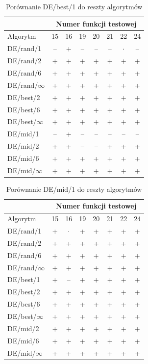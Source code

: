 \documentclass[a4paper,onecolumn,oneside,12pt,wide,floatssmall]{mwrep}
\theoremstyle{definition}
\theoremstyle{plain}%
\theoremstyle{remark}
\begin{document}
\begin{table}[H]
\centering
\begin{tabular}{ l | c | c | c | c | c | c | c }
		 & \multicolumn{7}{c}{Numer funkcji testowej}  \\  \hline
Algorytm         &15& 16& 19& 20& 21& 22& 24 \\ \hline
DE/rand/1	 & -- & + & -- & -- & -- & $\cdot$ & -- \\
DE/rand/2	 & + & + & + & + & + & + & + \\
DE/rand/6	 & + & + & + & + & + & + & + \\
DE/rand/$\infty$	 & + & + & + & + & + & + & + \\
DE/best/2	 & + & + & + & + & + & + & + \\
DE/best/6	 & + & + & + & + & + & + & + \\
DE/best/$\infty$	 & + & + & + & + & + & + & + \\
DE/mid/1	 & -- & + & -- & -- & -- & -- & -- \\
DE/mid/2	 & + & + & -- & -- & + & + & + \\
DE/mid/6	 & + & + & + & + & + & + & + \\
DE/mid/$\infty$	 & + & + & + & + & + & + & + \\

\end{tabular}
\caption{Porównanie DE/best/1 do reszty algorytmów}
\end{table}

\begin{table}[H]
\centering
\begin{tabular}{ l | c | c | c | c | c | c | c }
		 & \multicolumn{7}{c}{Numer funkcji testowej}  \\  \hline
Algorytm         &15& 16& 19& 20& 21& 22& 24 \\ \hline
DE/rand/1	 & + & $\cdot$ & + & + & + & + & + \\
DE/rand/2	 & + & + & + & + & + & + & + \\
DE/rand/6	 & + & + & + & + & + & + & + \\
DE/rand/$\infty$	 & + & + & + & + & + & + & + \\
DE/best/1	 & + & -- & + & + & + & + & + \\
DE/best/2	 & + & + & + & + & + & + & + \\
DE/best/6	 & + & + & + & + & + & + & + \\
DE/best/$\infty$	 & + & + & + & + & + & + & + \\
DE/mid/2	 & + & + & + & + & + & + & + \\
DE/mid/6	 & + & + & + & + & + & + & + \\
DE/mid/$\infty$	 & + & + & + & + & + & + & + \\
\end{tabular}
\caption{Porównanie DE/mid/1 do reszty algorytmów}
\end{table}
\end{document}

